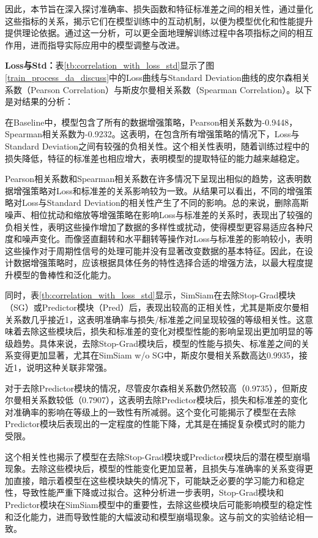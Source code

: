 \documentclass[master]{thesis-uestc}
\begin{document}
因此，本节旨在深入探讨准确率、损失函数和特征标准差之间的相关性，通过量化这些指标的关系，揭示它们在模型训练中的互动机制，以便为模型优化和性能提升提供理论依据。通过这一分析，可以更全面地理解训练过程中各项指标之间的相互作用，进而指导实际应用中的模型调整与改进。

\textbf{Loss与Std：}表\ref{tb:correlation_with_loss_std}显示了图\ref{train_process_da_discuss}中的Loss曲线与Standard Deviation曲线的皮尔森相关系数（Pearson Correlation）与斯皮尔曼相关系数（Spearman Correlation）。以下是对结果的分析：

在Baseline中，模型包含了所有的数据增强策略，Pearson相关系数为-0.9448，Spearman相关系数为-0.9232。这表明，在包含所有增强策略的情况下，Loss与Standard Deviation之间有较强的负相关性。这个相关性表明，随着训练过程中的损失降低，特征的标准差也相应增大，表明模型的提取特征的能力越来越稳定。

Pearson相关系数和Spearman相关系数在许多情况下呈现出相似的趋势，这表明数据增强策略对Loss和标准差的关系影响较为一致。从结果可以看出，不同的增强策略对Loss与Standard Deviation的相关性产生了不同的影响。总的来说，删除高斯噪声、相位扰动和缩放等增强策略在影响Loss与标准差的关系时，表现出了较强的负相关性，表明这些操作增加了数据的多样性或扰动，使得模型更容易适应各种尺度和噪声变化。而像竖直翻转和水平翻转等操作对Loss与标准差的影响较小，表明这些操作对于周期性信号的处理可能并没有显著改变数据的基本特征。因此，在设计数据增强策略时，应该根据具体任务的特性选择合适的增强方法，以最大程度提升模型的鲁棒性和泛化能力。

同时，表\ref{tb:correlation_with_loss_std}显示，SimSiam在去除Stop-Grad模块（SG）或Predictor模块（Pred）后，表现出较高的正相关性，尤其是斯皮尔曼相关系数几乎接近1，这表明准确率与损失/标准差之间呈现较强的等级相关性。这意味着去除这些模块后，损失和标准差的变化对模型性能的影响呈现出更加明显的等级趋势。具体来说，去除Stop-Grad模块后，模型的性能与损失、标准差之间的关系变得更加显著，尤其在SimSiam w/o SG中，斯皮尔曼相关系数高达0.9935，接近1，说明这种关联非常强。

对于去除Predictor模块的情况，尽管皮尔森相关系数仍然较高（0.9735），但斯皮尔曼相关系数较低（0.7907），这表明去除Predictor模块后，损失和标准差的变化对准确率的影响在等级上的一致性有所减弱。这个变化可能揭示了模型在去除Predictor模块后表现出的一定程度的性能下降，尤其是在捕捉复杂模式时的能力受限。

这个相关性也揭示了模型在去除Stop-Grad模块或Predictor模块后的潜在模型崩塌现象。去除这些模块后，模型的性能变化更加显著，且损失与准确率的关系变得更加直接，暗示着模型在这些模块缺失的情况下，可能缺乏必要的学习能力和稳定性，导致性能严重下降或过拟合。这种分析进一步表明，Stop-Grad模块和Predictor模块在SimSiam模型中的重要性，去除这些模块后可能影响模型的稳定性和泛化能力，进而导致性能的大幅波动和模型崩塌现象。这与前文的实验结论相一致。
\end{document}
